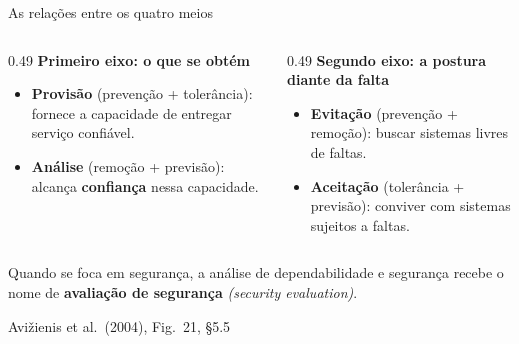 \documentclass{beamer}
\newcommand{\en}[1]{{\color{depCinza}\textit{#1}}}
\newcommand{\sect}[1]{\par\smallskip\hfill{\tiny\color{black!55}Avi\v{z}ienis et al.\ (2004), #1}}
\begin{document}
\begin{frame}{As rela\c{c}\~oes entre os quatro meios}
    \centering
    \diagMeiosAgrupados
    \vspace{0.2em}
    \scriptsize
    \begin{columns}[T]
        \begin{column}{0.49\textwidth}
            \textbf{Primeiro eixo: o que se obt\'em}
            \begin{itemize}
                \item \textbf{Provis\~ao} (preven\c{c}\~ao + toler\^ancia): fornece a capacidade de entregar servi\c{c}o confi\'avel.
                \item \textbf{An\'alise} (remo\c{c}\~ao + previs\~ao): alcan\c{c}a \textbf{confian\c{c}a} nessa capacidade.
            \end{itemize}
        \end{column}
        \begin{column}{0.49\textwidth}
            \textbf{Segundo eixo: a postura diante da falta}
            \begin{itemize}
                \item \textbf{Evita\c{c}\~ao} (preven\c{c}\~ao + remo\c{c}\~ao): buscar sistemas livres de faltas.
                \item \textbf{Aceita\c{c}\~ao} (toler\^ancia + previs\~ao): conviver com sistemas sujeitos a faltas.
            \end{itemize}
        \end{column}
    \end{columns}
    \smallskip
    \begin{ancora}
        \scriptsize
        Quando se foca em seguran\c{c}a, a an\'alise de dependabilidade e seguran\c{c}a recebe o nome de \textbf{avalia\c{c}\~ao de seguran\c{c}a} \en{(security evaluation)}.
    \end{ancora}
    \sect{Fig.\ 21, \S5.5}
\end{frame}
\end{document}
